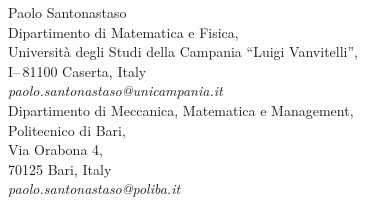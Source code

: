 \documentclass[a4paper, 11pt]{article}
\begin{document}
\medskip


Paolo Santonastaso\\
Dipartimento di Matematica e Fisica,\\
Universit\`a degli Studi della Campania ``Luigi Vanvitelli'',\\
I--\,81100 Caserta, Italy\\
{{\em paolo.santonastaso@unicampania.it}  \\
Dipartimento di Meccanica, Matematica e Management, \\
Politecnico di Bari, \\
Via Orabona 4, \\
70125 Bari, Italy \\
{\em paolo.santonastaso@poliba.it}
}
\end{document}
